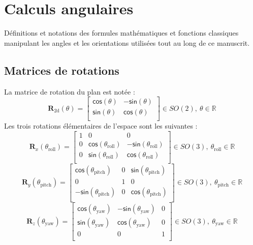 
\chapter{Calculs angulaires}

Définitions et notations des formules mathématiques 
et fonctions classiques manipulant les angles et les orientations
utilisées tout au long de ce manuscrit.

\section{Matrices de rotations\label{sec:rotation_matrix}}

La matrice de rotation du plan est notée :
$$
\bm{R}_{\text{2d}}(\theta)
=
\begin{bmatrix}
\mathsf{cos}(\theta) & -\mathsf{sin}(\theta) \\
\mathsf{sin}(\theta) & \mathsf{cos}(\theta) \\
\end{bmatrix}
\in SO(2),~\theta \in \mathbb{R}
$$
Les trois rotations élémentaires de l'espace sont les suivantes :
$$
\bm{R}_x(\theta_{\text{roll}})
=
\begin{bmatrix}
1 & 0 & 0 \\
0 & \mathsf{cos}(\theta_{\text{roll}}) & -\mathsf{sin}(\theta_{\text{roll}}) \\
0 & \mathsf{sin}(\theta_{\text{roll}}) & \mathsf{cos}(\theta_{\text{roll}}) \\
\end{bmatrix}
\in SO(3),~\theta_{\text{roll}} \in \mathbb{R}
$$
$$
\bm{R}_y(\theta_{\text{pitch}})
=
\begin{bmatrix}
\mathsf{cos}(\theta_{\text{pitch}}) & 0 & \mathsf{sin}(\theta_{\text{pitch}}) \\
0 & 1 & 0 \\
-\mathsf{sin}(\theta_{\text{pitch}}) & 0 & \mathsf{cos}(\theta_{\text{pitch}}) \\
\end{bmatrix}
\in SO(3),~\theta_{\text{pitch}} \in \mathbb{R}
$$
$$
\bm{R}_z(\theta_{\text{yaw}})
=
\begin{bmatrix}
\mathsf{cos}(\theta_{\text{yaw}}) & -\mathsf{sin}(\theta_{\text{yaw}}) & 0\\
\mathsf{sin}(\theta_{\text{yaw}}) & \mathsf{cos}(\theta_{\text{yaw}}) & 0\\
0 & 0 & 1 \\
\end{bmatrix}
\in SO(3),~\theta_{\text{yaw}} \in \mathbb{R}
$$

